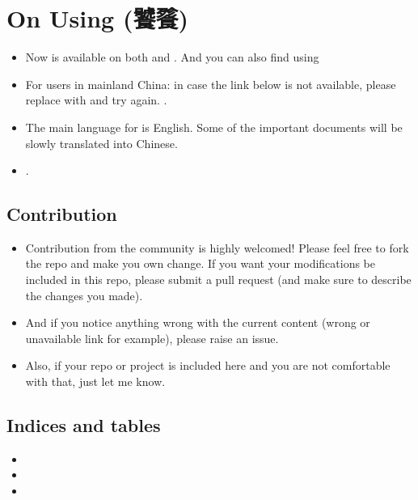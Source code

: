 \documentclass[letterpaper,10pt,english]{sphinxmanual}
\begin{document}
\chapter{On Using  (饕餮)}
\label{\detokenize{index:on-using-taotie}}\begin{itemize}
\item {} 
Now  is available on both 
and .
And you can also find  using 

\item {} 
For users in mainland China: in case the  link below is not available,
please replace  with  and try again.
.

\item {} 
The main language for  is English. Some of the important documents will be slowly
translated into Chinese.

\item {} 
.

\end{itemize}


\section{Contribution}
\label{\detokenize{index:contribution}}\begin{itemize}
\item {} 
Contribution from the community is highly welcomed! Please feel free to fork the repo and
make you own change.
If you want your modifications be included in this repo, please submit a pull request
(and make sure to describe the changes you made).

\item {} 
And if you notice anything wrong with the current content (wrong or unavailable link for example),
please raise an issue.

\item {} 
Also, if your repo or project is included here and you are not comfortable with that, just
let me know.

\end{itemize}


\section{Indices and tables}
\label{\detokenize{index:indices-and-tables}}\begin{itemize}
\item {} 

\item {} 

\item {} 

\end{itemize}



\renewcommand{\indexname}{Index}
\printindex
\end{document}
